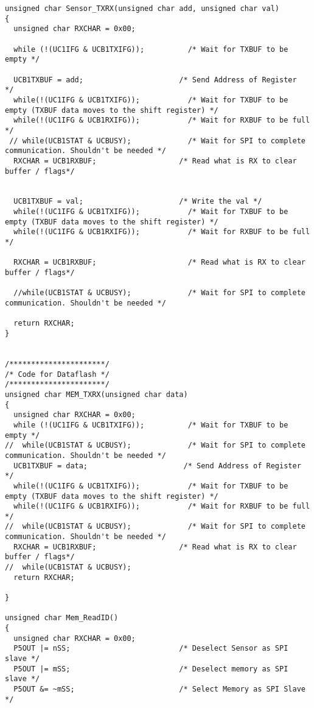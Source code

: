 \begin{lstlisting}[caption=Main.c,label=Code4]
unsigned char Sensor_TXRX(unsigned char add, unsigned char val)
{
  unsigned char RXCHAR = 0x00;
          
  while (!(UC1IFG & UCB1TXIFG));          /* Wait for TXBUF to be empty */
  
  UCB1TXBUF = add;                      /* Send Address of Register  */
  while(!(UC1IFG & UCB1TXIFG));           /* Wait for TXBUF to be empty (TXBUF data moves to the shift register) */
  while(!(UC1IFG & UCB1RXIFG));           /* Wait for RXBUF to be full */     
 // while(UCB1STAT & UCBUSY);             /* Wait for SPI to complete communication. Shouldn't be needed */
  RXCHAR = UCB1RXBUF;                   /* Read what is RX to clear buffer / flags*/
  
  
  UCB1TXBUF = val;                      /* Write the val */      
  while(!(UC1IFG & UCB1TXIFG));           /* Wait for TXBUF to be empty (TXBUF data moves to the shift register) */
  while(!(UC1IFG & UCB1RXIFG));           /* Wait for RXBUF to be full */  
    
  RXCHAR = UCB1RXBUF;                     /* Read what is RX to clear buffer / flags*/
        
  //while(UCB1STAT & UCBUSY);             /* Wait for SPI to complete communication. Shouldn't be needed */
  
  return RXCHAR;
}


/**********************/
/* Code for Dataflash */
/**********************/
unsigned char MEM_TXRX(unsigned char data)
{
  unsigned char RXCHAR = 0x00;
  while (!(UC1IFG & UCB1TXIFG));          /* Wait for TXBUF to be empty */
//  while(UCB1STAT & UCBUSY);             /* Wait for SPI to complete communication. Shouldn't be needed */
  UCB1TXBUF = data;                      /* Send Address of Register  */
  while(!(UC1IFG & UCB1TXIFG));           /* Wait for TXBUF to be empty (TXBUF data moves to the shift register) */
  while(!(UC1IFG & UCB1RXIFG));           /* Wait for RXBUF to be full */ 
//  while(UCB1STAT & UCBUSY);             /* Wait for SPI to complete communication. Shouldn't be needed */
  RXCHAR = UCB1RXBUF;                   /* Read what is RX to clear buffer / flags*/
//  while(UCB1STAT & UCBUSY);
  return RXCHAR;
  
}

unsigned char Mem_ReadID()
{
  unsigned char RXCHAR = 0x00;
  P5OUT |= nSS;                         /* Deselect Sensor as SPI slave */ 
  P5OUT |= mSS;                         /* Deselect memory as SPI slave */ 
  P5OUT &= ~mSS;                        /* Select Memory as SPI Slave */
  

\end{lstlisting}
